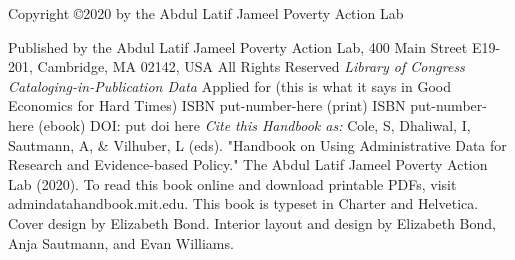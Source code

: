  
\bigskip
Copyright \copyright 2020 by the Abdul Latif Jameel Poverty Action Lab

Published by the Abdul Latif Jameel Poverty Action Lab, 400 Main Street E19-201, 
Cambridge, MA 02142, USA
\bigskip
\newline
All Rights Reserved
\bigskip
\newline
\textit{Library of Congress Cataloging-in-Publication Data}
\newline
Applied for (this is what it says in Good Economics for Hard Times)
\bigskip
\newline
ISBN put-number-here (print)
\newline ISBN put-number-here (ebook) 
\newline DOI: put doi here 
\bigskip
\newline
\textit{Cite this Handbook as: }
\newline Cole, S, Dhaliwal, I, Sautmann, A, \& Vilhuber, L (eds). "Handbook on Using Administrative Data for Research and Evidence-based Policy." The Abdul Latif Jameel Poverty Action Lab (2020). 
\bigskip
\newline
To read this book online and download printable PDFs, visit \newline admindatahandbook.mit.edu. 
\bigskip
\newline
This book is typeset in Charter and Helvetica. 
\newline Cover design by Elizabeth Bond. Interior layout and design by Elizabeth Bond, Anja Sautmann, and Evan Williams. 






